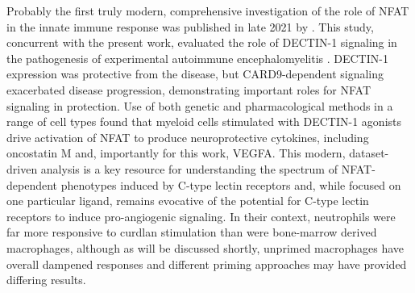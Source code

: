 Probably the first truly modern, comprehensive investigation of the role of NFAT in the innate immune response was published in late 2021 by \citeauthor{Deerhake2021}. This study, concurrent with the present work, evaluated the role of DECTIN\hyp{}1 signaling in the pathogenesis of experimental autoimmune encephalomyelitis \citep{Deerhake2021}. DECTIN\hyp{}1 expression was protective from the disease, but CARD9\hyp{}dependent signaling exacerbated disease progression, demonstrating important roles for NFAT signaling in protection. Use of both genetic and pharmacological methods in a range of cell types found that myeloid cells stimulated with DECTIN\hyp{}1 agonists drive activation of NFAT to produce neuroprotective cytokines, including oncostatin M and, importantly for this work, VEGFA. This modern, dataset\hyp{}driven analysis is a key resource for understanding the spectrum of NFAT\hyp{}dependent phenotypes induced by C\hyp{}type lectin receptors and, while focused on one particular ligand, remains evocative of the potential for C\hyp{}type lectin receptors to induce pro\hyp{}angiogenic signaling. In their context, neutrophils were far more responsive to curdlan stimulation than were bone\hyp{}marrow derived macrophages, although as will be discussed shortly, unprimed macrophages have overall dampened responses and different priming approaches may have provided differing results.

